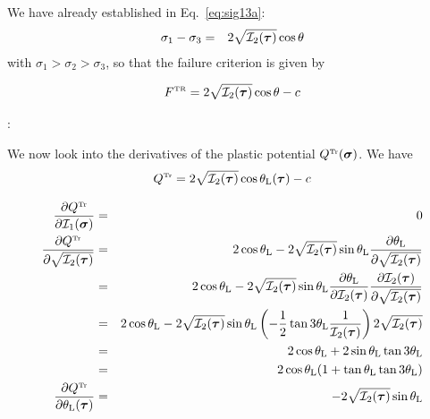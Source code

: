 We have already established in Eq.~\eqref{eq:sig13a}:
\begin{eqnarray}
\sigma_1 - \sigma_3  &=& 2 \sqrt{{\cal I}_2({\bm \tau})} \cos \theta \nonumber
\end{eqnarray}
with $\sigma_1>\sigma_2>\sigma_3$,
so that the failure criterion is given by
\begin{mdframed}[backgroundcolor=blue!5]
\[
F^{\text{\tiny TR}}=2\sqrt{ {\cal I}_2({\bm \tau})  } \cos \theta - c 
\]
\end{mdframed}

\Literature: 

\vspace{.5cm}

We now look into the derivatives of the plastic potential $Q^{\text{\tiny Tr}}(\bm\sigma)$.
We have
\[
Q^{\text{\tiny Tr}}=2\sqrt{ {\cal I}_2({\bm \tau})  } \cos \theta_{\rm L}(\bm\tau) - c
\]

\begin{eqnarray}
\frac{\partial Q^{\text{\tiny Tr}}    }{\partial {\cal I}_1(\bm\sigma)} 
&=& 0 \\
\frac{\partial Q^{\text{\tiny Tr}}    }{\partial \sqrt {{\cal I}_2(\bm\tau)}}
&=& 2 \cos\theta_{\rm L} - 2 \sqrt{ {\cal I}_2({\bm \tau})  } \sin\theta_{\rm L}  
\frac{\partial\theta_{\rm L}}{\partial \sqrt{{\cal I}_2(\bm\tau)}} \nonumber\\
&=& 2 \cos\theta_{\rm L} - 2 \sqrt{ {\cal I}_2({\bm \tau})  } \sin\theta_{\rm L}  
\frac{\partial\theta_{\rm L}}{\partial {{\cal I}_2(\bm\tau)}} 
\frac{\partial {{\cal I}_2(\bm\tau)}}{\partial \sqrt{{\cal I}_2(\bm\tau)}}
\nonumber\\
&=& 2 \cos\theta_{\rm L} - 2 \sqrt{ {\cal I}_2({\bm \tau})  } \sin\theta_{\rm L}  
\left( -\frac12 \tan 3\theta_{\rm L} \frac{1}{ {\cal I}_2(\bm\tau)}  \right)
2 \sqrt{{\cal I}_2(\bm\tau)}
\nonumber\\
&=& 2 \cos\theta_{\rm L} +  2 \sin\theta_{\rm L}  
\tan 3\theta_{\rm L} 
\nonumber\\
&=& 2 \cos\theta_{\rm L} ( 1 + \tan\theta_{\rm L}  \tan 3\theta_{\rm L}) \\
\frac{\partial Q^{\text{\tiny Tr}} }{\partial \theta_{\rm L}(\bm\tau)} 
&=& 
-2\sqrt{ {\cal I}_2({\bm \tau})  } \sin \theta_{\rm L} 
\end{eqnarray}


